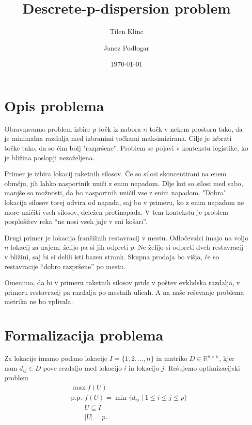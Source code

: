 \documentclass{amsart}
\title{Descrete-p-dispersion problem}
\author{Tilen Klinc}
\author{Janez Podlogar}
\date{\today}
\begin{document}
    
\maketitle

\section{Opis problema}

Obravnavamo problem izbire $ p $ točk iz nabora $ n $ točk v nekem prostoru
tako, da je minimalna razdalja med izbranimi točkami maksimizirana. Cilje je
izbrati točke tako, da so čim bolj "razpršene". Problem se pojavi v kontekstu
logistike, ko je bližina poslopji nezaželjena.


Primer je izbira lokacij raketnih silosov. Če so silosi skoncentirani na enem
obmčju, jih lahko nasportnik uniči z enim napadom. Dlje kot so silosi med sabo,
manjše so možnosti, da bo nasportnih uničil vse z enim napadom. "Dobra" lokacija
silosov torej odvira od napada, saj bo v primeru, ko z enim napadom ne more uničiti
vseh silosov, deležen protinapada. V tem kontekstu je problem posplošitev reka 
``ne nosi vseh jajc v eni košari''.

Drugi primer je lokacija franšižnih restavracij v mestu. Odločevalci imajo na voljo $ n $
lokacij za najem, želijo pa si jih odpreti $ p $. Ne želijo si odpreti dveh restavracij
v bližini, saj bi si delili isti bazen strank. Skupna prodaja bo višja, če so restavracije
``dobro razpršene'' po mestu.

Omenimo, da bi v primeru raketnih silosov pride v poštev evklidska razdalja, v primeru
restavracij pa razdalja po mestnih ulicah. A na naše reševanje problema metrika ne bo 
vplivala.

\section{Formalizacija problema}

Za lokacije imamo podano lokacije $ I = \{ 1, 2, \ldots, n \} $ in matriko $ D \in 
\mathbb{R}^{n \times n} $, kjer nam $ d_{ij} \in D $ pove rezdaljo med lokacijo $ i $
in lokacijo $ j $. Rešujemo optimizacijski problem
\begin{align*}
    & \max f(U) \\
    & \text{p.p. } f(U) = \min \{ d_{ij} \mid 1 \leq i \leq j \leq p \} \\
    & \qquad U \subseteq I \\
    & \qquad |U| = p .
\end{align*}
\end{document}
